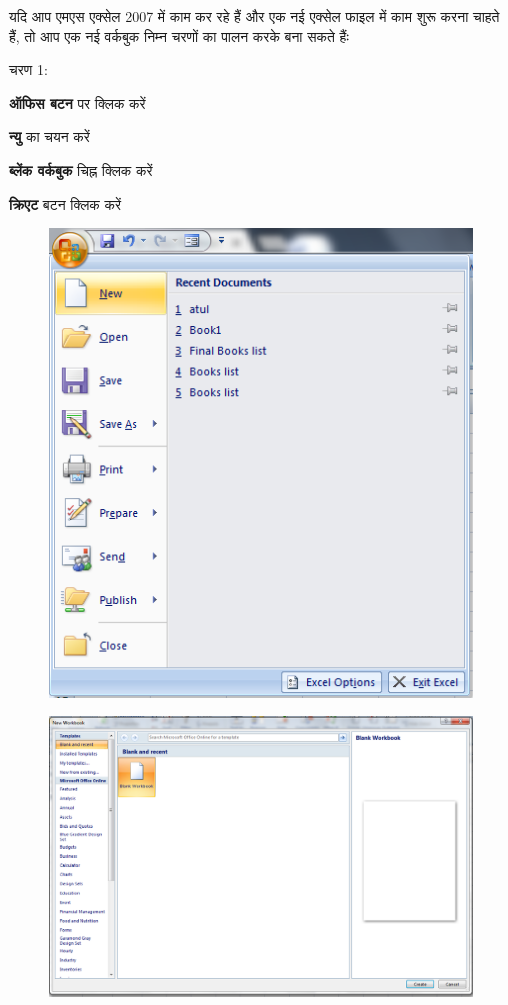 यदि आप एमएस एक्सेल 2007 में काम कर रहे हैं और एक नई एक्सेल फाइल में काम शुरू करना चाहते हैं, तो आप एक नई वर्कबुक निम्न चरणों का पालन करके बना सकते हैंः 
\begin{descriptionSimple}{चरण 1:}
\item[चरण 1] \textbf{ऑफिस बटन} पर क्लिक करें
\item[चरण 2] \textbf{न्यु} का चयन करें
\item[चरण 3] \textbf{ब्लेंक वर्कबुक} चिह्न क्लिक करें
\item[चरण 4] \textbf{क्रिएट} बटन क्लिक करें
\end{descriptionSimple}
\begin{figure}[H]
\centering
\includegraphics[scale=0.4]{src/images/chapter1/chapter1_fig03.png}
\end{figure}
\newpage

\begin{figure}[H]
\centering
\includegraphics[scale=0.3]{src/images/chapter1/chapter1_fig04.png}
\end{figure}

